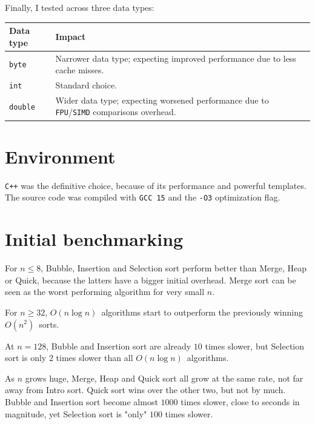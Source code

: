 \documentclass[11pt, a4paper]{article}
\newcommand{\Onn}{$O(n^2)$}
\newcommand{\Onlogn}{$O(n \log n)$}
\begin{document}
\medskip

Finally, I tested across three data types:
\begin{center}
\setlength{\tabcolsep}{12pt}
\begin{tabularx}{0.8\textwidth}{lX}
    \toprule
    \textbf{Data type} & \textbf{Impact} \\
    \midrule
    \texttt{byte}      & Narrower data type; expecting improved performance due to less cache misses. \\
    \addlinespace
    \texttt{int}       & Standard choice. \\
    \addlinespace
    \texttt{double}    & Wider data type; expecting worsened performance due to \texttt{FPU}/\texttt{SIMD} comparisons overhead. \\
    \bottomrule
\end{tabularx}
\end{center}


\section{Environment}
\texttt{C++} was the definitive choice, because of its performance and powerful templates. The source code was compiled with \texttt{GCC 15} and the \texttt{-O3} optimization flag.

\newpage
\section{Initial benchmarking} \label{sec:initial-bench}
\newpage
For $n \leq 8$, Bubble, Insertion and Selection sort perform better than Merge, Heap or Quick, because the latters have a bigger initial overhead. Merge sort can be seen as the worst performing algorithm for very small $n$.

For $n \geq 32$, \Onlogn\ algorithms start to outperform the previously winning \Onn\ sorts.

At $n = 128$, Bubble and Insertion sort are already $10$ times slower, but Selection sort is only 2 times slower than all \Onlogn\ algorithms.

As $n$ grows huge, Merge, Heap and Quick sort all grow at the same rate, not far away from Intro sort. Quick sort wins over the other two, but not by much. Bubble and Insertion sort become almost $1000$ times slower, close to seconds in magnitude, yet Selection sort is "only" $100$ times slower.
\end{document}
